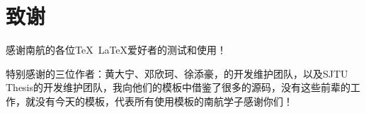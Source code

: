 \chapter{致谢}

感谢南航的各位\TeX~\LaTeX 爱好者的测试和使用！

特别感谢\oldnuaathesis 的三位作者：黄大宁、邓欣珂、徐添豪，\seuthesix 的开发维护团队，以及SJTU Thesis的开发维护团队，我向他们的模板中借鉴了很多的源码，没有这些前辈的工作，就没有今天的\nuaathesis 模板，代表所有使用\nuaathesis 模板的南航学子感谢你们！
